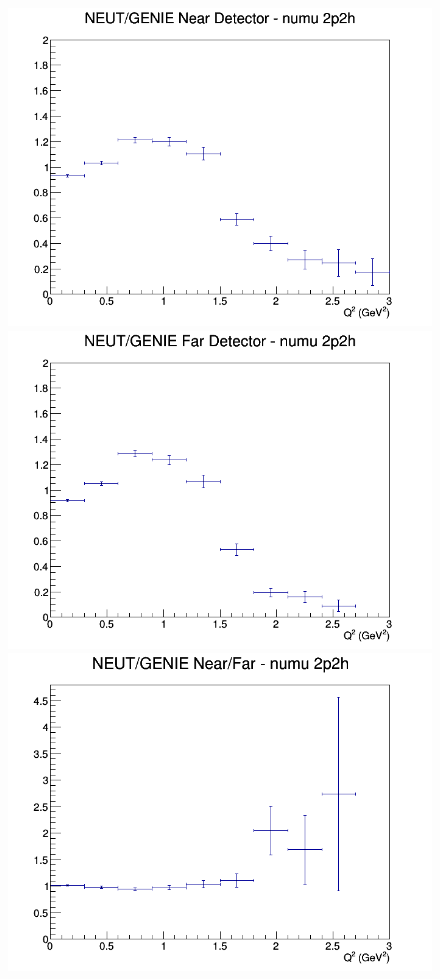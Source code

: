 \begin{figure}[h]
\endminipage
\newline
{}
\includegraphics[width=\linewidth]{eff_Q2/LAr/ratios/2p2h_NEUT_GENIE_numu_near_Q2.png}
\endminipage
{}
\includegraphics[width=\linewidth]{eff_Q2/LAr/ratios/2p2h_NEUT_GENIE_numu_far_Q2.png}
\endminipage
{}
\includegraphics[width=\linewidth]{eff_Q2/LAr/ratios/2p2h_NEUT_GENIE_numu_NF_Q2.png}

\end{figure}
